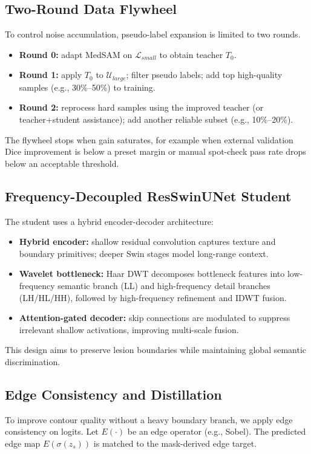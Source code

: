 ﻿\documentclass[11pt]{article}
\begin{document}
\subsection{Two-Round Data Flywheel}
To control noise accumulation, pseudo-label expansion is limited to two rounds.
\begin{itemize}[leftmargin=1.5em]
\item \textbf{Round 0:} adapt MedSAM on $\mathcal{L}_{small}$ to obtain teacher $T_0$.
\item \textbf{Round 1:} apply $T_0$ to $\mathcal{U}_{large}$; filter pseudo labels; add top high-quality samples (e.g., 30\%--50\%) to training.
\item \textbf{Round 2:} reprocess hard samples using the improved teacher (or teacher+student assistance); add another reliable subset (e.g., 10\%--20\%).
\end{itemize}
The flywheel stops when gain saturates, for example when external validation Dice improvement is below a preset margin or manual spot-check pass rate drops below an acceptable threshold.

\subsection{Frequency-Decoupled ResSwinUNet Student}
The student uses a hybrid encoder-decoder architecture:
\begin{itemize}[leftmargin=1.5em]
\item \textbf{Hybrid encoder:} shallow residual convolution captures texture and boundary primitives; deeper Swin stages model long-range context.
\item \textbf{Wavelet bottleneck:} Haar DWT decomposes bottleneck features into low-frequency semantic branch (LL) and high-frequency detail branches (LH/HL/HH), followed by high-frequency refinement and IDWT fusion.
\item \textbf{Attention-gated decoder:} skip connections are modulated to suppress irrelevant shallow activations, improving multi-scale fusion.
\end{itemize}
This design aims to preserve lesion boundaries while maintaining global semantic discrimination.

\subsection{Edge Consistency and Distillation}
To improve contour quality without a heavy boundary branch, we apply edge consistency on logits. Let $E(\cdot)$ be an edge operator (e.g., Sobel). The predicted edge map $E(\sigma(z_s))$ is matched to the mask-derived edge target.
\end{document}
